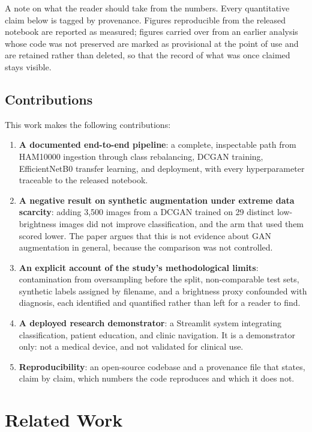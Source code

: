 \documentclass[ai,article,submit,pdftex,moreauthors]{Definitions/mdpi}
\begin{document}
A note on what the reader should take from the numbers. Every quantitative claim below is tagged by provenance. Figures reproducible from the released notebook are reported as measured; figures carried over from an earlier analysis whose code was not preserved are marked as provisional at the point of use and are retained rather than deleted, so that the record of what was once claimed stays visible.

\subsection{Contributions}

This work makes the following contributions:
\begin{enumerate}[leftmargin=*, itemsep=2pt]
    \item \textbf{A documented end-to-end pipeline}: a complete, inspectable path from HAM10000 ingestion through class rebalancing, DCGAN training, EfficientNetB0 transfer learning, and deployment, with every hyperparameter traceable to the released notebook.
    \item \textbf{A negative result on synthetic augmentation under extreme data scarcity}: adding 3,500 images from a DCGAN trained on 29 distinct low-brightness images did not improve classification, and the arm that used them scored lower. The paper argues that this is not evidence about GAN augmentation in general, because the comparison was not controlled.
    \item \textbf{An explicit account of the study's methodological limits}: contamination from oversampling before the split, non-comparable test sets, synthetic labels assigned by filename, and a brightness proxy confounded with diagnosis, each identified and quantified rather than left for a reader to find.
    \item \textbf{A deployed research demonstrator}: a Streamlit system integrating classification, patient education, and clinic navigation. It is a demonstrator only: not a medical device, and not validated for clinical use.
    \item \textbf{Reproducibility}: an open-source codebase and a provenance file that states, claim by claim, which numbers the code reproduces and which it does not.
\end{enumerate}

\section{Related Work}
\end{document}
